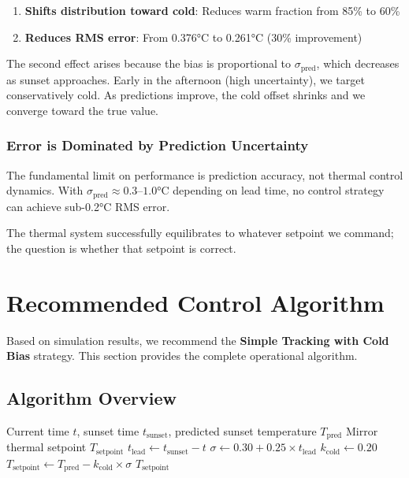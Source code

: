 \documentclass[11pt,letterpaper]{article}
\begin{document}
\begin{enumerate}
    \item \textbf{Shifts distribution toward cold}: Reduces warm fraction from 85\% to 60\%
    \item \textbf{Reduces RMS error}: From 0.376°C to 0.261°C (30\% improvement)
\end{enumerate}

The second effect arises because the bias is proportional to $\sigma_{\text{pred}}$, which decreases as sunset approaches. Early in the afternoon (high uncertainty), we target conservatively cold. As predictions improve, the cold offset shrinks and we converge toward the true value.

\subsubsection{Error is Dominated by Prediction Uncertainty}

The fundamental limit on performance is prediction accuracy, not thermal control dynamics. With $\sigma_{\text{pred}} \approx 0.3$--$1.0$°C depending on lead time, no control strategy can achieve sub-0.2°C RMS error.

The thermal system successfully equilibrates to whatever setpoint we command; the question is whether that setpoint is correct.

\section{Recommended Control Algorithm}

Based on simulation results, we recommend the \textbf{Simple Tracking with Cold Bias} strategy. This section provides the complete operational algorithm.

\subsection{Algorithm Overview}

\begin{algorithm}[H]
\caption{Mirror Thermal Setpoint Control}
\label{alg:setpoint}
\begin{algorithmic}[1]
\Require Current time $t$, sunset time $t_{\text{sunset}}$, predicted sunset temperature $T_{\text{pred}}$
\Ensure Mirror thermal setpoint $T_{\text{setpoint}}$
\State $t_{\text{lead}} \gets t_{\text{sunset}} - t$ 
\State $\sigma \gets 0.30 + 0.25 \times t_{\text{lead}}$ 
\State $k_{\text{cold}} \gets 0.20$ 
\State $T_{\text{setpoint}} \gets T_{\text{pred}} - k_{\text{cold}} \times \sigma$
\State \Return $T_{\text{setpoint}}$
\end{algorithmic}
\end{algorithm}
\end{document}
